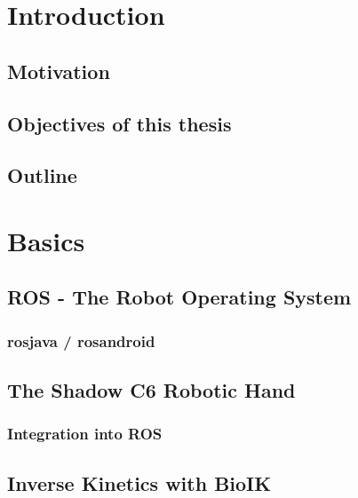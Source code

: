 \documentclass[11pt,DIV=15,BCOR=20mm,bibliography=totoc]{scrbook}
\begin{document}


\frontmatter

\tableofcontents
\cleardoublepage

\mainmatter

\chapter{Introduction}
\section{Motivation}

\section{Objectives of this thesis}

\section{Outline}


\chapter{Basics}

\section{ROS - The Robot Operating System}
\subsection{rosjava / rosandroid}

\section{The Shadow C6 Robotic Hand}
\subsection{Integration into ROS}

\section{Inverse Kinetics with BioIK}
\end{document}
